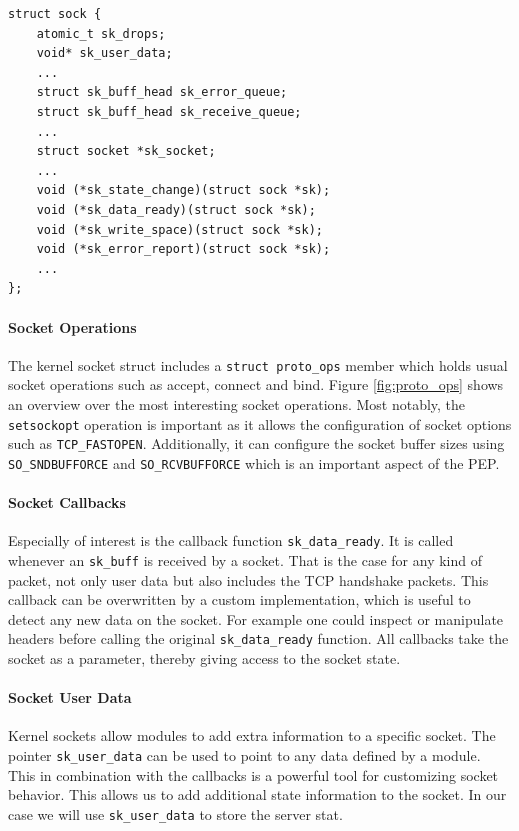 \documentclass[a4paper,english, 11pt]{report}
\begin{document}
\noindent\begin{minipage}{\linewidth}
\begin{verbatim}
struct sock {
    atomic_t sk_drops;
    void* sk_user_data;
    ...
    struct sk_buff_head	sk_error_queue;
    struct sk_buff_head	sk_receive_queue;
    ...
    struct socket *sk_socket;
    ...
    void (*sk_state_change)(struct sock *sk);
    void (*sk_data_ready)(struct sock *sk);
    void (*sk_write_space)(struct sock *sk);
    void (*sk_error_report)(struct sock *sk);
    ...
};
\end{verbatim}
\label{fig:kern_sock}
\end{minipage}

\paragraph{Socket Operations}
The kernel socket struct includes a \verb|struct proto_ops| member which holds usual socket operations such as accept, connect and bind.
Figure \ref{fig:proto_ops} shows an overview over the most interesting socket operations. Most notably, the \verb|setsockopt| operation is important as it allows the configuration of socket options such as \verb|TCP_FASTOPEN|. Additionally, it can configure the socket buffer sizes using \verb|SO_SNDBUFFORCE| and \verb|SO_RCVBUFFORCE| which is an important aspect of the PEP.

\paragraph{Socket Callbacks}
Especially of interest is the callback function \verb|sk_data_ready|. It is called whenever an \verb|sk_buff| is received by a socket. That is the case for any kind of packet, not only user data but also includes the TCP handshake packets. This callback can be overwritten by a custom implementation, which is useful to detect any new data on the socket. For example one could inspect or manipulate headers before calling the original \verb|sk_data_ready| function. All callbacks take the socket as a parameter, thereby giving access to the socket state. \\

\paragraph{Socket User Data}
Kernel sockets allow modules to add extra information to a specific socket. The pointer \verb|sk_user_data| can be used to point to any data defined by a module. This in combination with the callbacks is a powerful tool for customizing socket behavior. This allows us to add additional state information to the socket. In our case we will use \verb|sk_user_data| to store the server stat.\\
\end{document}
